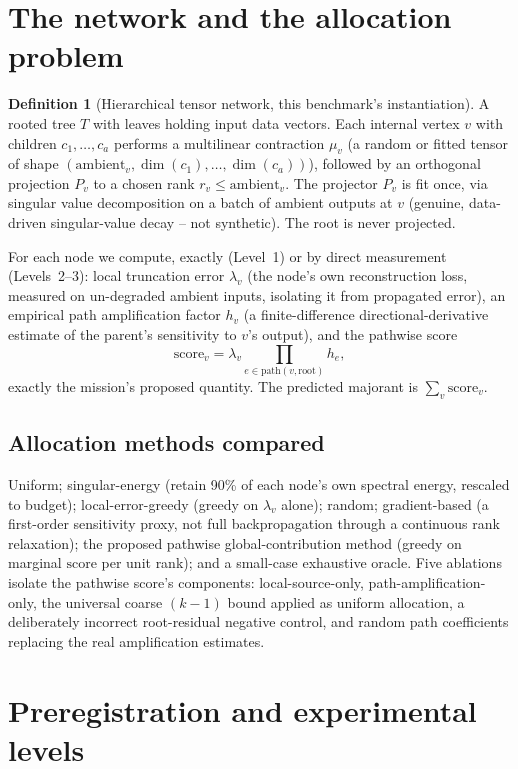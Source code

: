 \documentclass[11pt]{amsart}
\theoremstyle{remark}
\theoremstyle{definition}
\newtheorem{definition}{Definition}[section]
\begin{document}
\section{The network and the allocation problem}

\begin{definition}[Hierarchical tensor network, this benchmark's instantiation]
A rooted tree $T$ with leaves holding input data vectors. Each internal vertex $v$ with
children $c_1,\dots,c_a$ performs a multilinear contraction $\mu_v$ (a random or fitted
tensor of shape $(\text{ambient}_v, \dim(c_1),\dots,\dim(c_a))$), followed by an orthogonal
projection $P_v$ to a chosen rank $r_v \le \text{ambient}_v$. The projector $P_v$ is fit
once, via singular value decomposition on a batch of ambient outputs at $v$ (genuine,
data-driven singular-value decay -- not synthetic). The root is never projected.
\end{definition}

For each node we compute, exactly (Level~1) or by direct measurement (Levels~2--3):
local truncation error $\lambda_v$ (the node's own reconstruction loss, measured on
un-degraded ambient inputs, isolating it from propagated error), an empirical path
amplification factor $h_v$ (a finite-difference directional-derivative estimate of the
parent's sensitivity to $v$'s output), and the pathwise score
\[
  \mathrm{score}_v = \lambda_v \prod_{e \in \mathrm{path}(v,\mathrm{root})} h_e,
\]
exactly the mission's proposed quantity. The predicted majorant is $\sum_v \mathrm{score}_v$.

\subsection{Allocation methods compared}

Uniform; singular-energy (retain 90\% of each node's own spectral energy, rescaled to
budget); local-error-greedy (greedy on $\lambda_v$ alone); random; gradient-based (a
first-order sensitivity proxy, not full backpropagation through a continuous rank
relaxation); the proposed pathwise global-contribution method (greedy on marginal
$\mathrm{score}$ per unit rank); and a small-case exhaustive oracle. Five ablations
isolate the pathwise score's components: local-source-only, path-amplification-only, the
universal coarse $(k-1)$ bound applied as uniform allocation, a deliberately incorrect
root-residual negative control, and random path coefficients replacing the real
amplification estimates.

\section{Preregistration and experimental levels}
\end{document}
